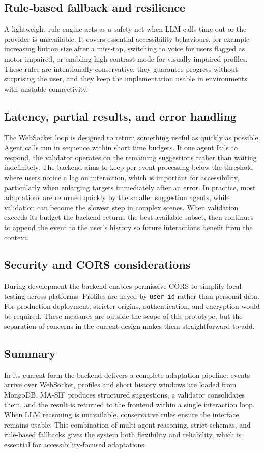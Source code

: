 \documentclass[openany]{book}
\begin{document}
\subsection{Rule‑based fallback and resilience}
A lightweight rule engine acts as a safety net when LLM calls time out or the provider is unavailable. It covers essential accessibility behaviours, for example increasing button size after a miss‑tap, switching to voice for users flagged as motor‑impaired, or enabling high‑contrast mode for visually impaired profiles. These rules are intentionally conservative, they guarantee progress without surprising the user, and they keep the implementation usable in environments with unstable connectivity.

\subsection{Latency, partial results, and error handling}
The WebSocket loop is designed to return something useful as quickly as possible. Agent calls run in sequence within short time budgets. If one agent fails to respond, the validator operates on the remaining suggestions rather than waiting indefinitely. The backend aims to keep per‑event processing below the threshold where users notice a lag on interaction, which is important for accessibility, particularly when enlarging targets immediately after an error. In practice, most adaptations are returned quickly by the smaller suggestion agents, while validation can become the slowest step in complex scenes. When validation exceeds its budget the backend returns the best available subset, then continues to append the event to the user’s history so future interactions benefit from the context.

\subsection{Security and CORS considerations}
During development the backend enables permissive CORS to simplify local testing across platforms. Profiles are keyed by \texttt{user\_id} rather than personal data. For production deployment, stricter origins, authentication, and encryption would be required. These measures are outside the scope of this prototype, but the separation of concerns in the current design makes them straightforward to add.

\subsection{Summary}
In its current form the backend delivers a complete adaptation pipeline: events arrive over WebSocket, profiles and short history windows are loaded from MongoDB, MA‑SIF produces structured suggestions, a validator consolidates them, and the result is returned to the frontend within a single interaction loop. When LLM reasoning is unavailable, conservative rules ensure the interface remains usable. This combination of multi‑agent reasoning, strict schemas, and rule-based fallbacks gives the system both flexibility and reliability, which is essential for accessibility‑focused adaptations.
\end{document}
